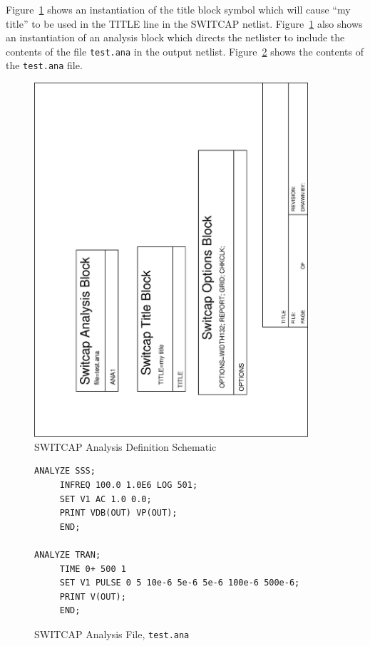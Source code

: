 \documentclass{article}
\begin{document}
Figure~\ref{fig:analysis} shows an instantiation of the title block
symbol which will cause ``my title'' to be used in the TITLE line in
the SWITCAP netlist. 
Figure~\ref{fig:analysis} also shows an instantiation of an analysis
block which directs the netlister to include the contents of the file
{\tt test.ana} in the output netlist.  Figure~\ref{fig:test.ana} shows
the contents of the {\tt test.ana} file.
\begin{figure}
\begin{center}
\includegraphics[angle=270,width=4in]{analysis.eps}
\end{center}
\caption{SWITCAP Analysis Definition Schematic}
\label{fig:analysis}
\end{figure}
\begin{figure}
\begin{center}
\begin{verbatim}
ANALYZE SSS;
     INFREQ 100.0 1.0E6 LOG 501;
     SET V1 AC 1.0 0.0;
     PRINT VDB(OUT) VP(OUT);
     END;

ANALYZE TRAN;
     TIME 0+ 500 1
     SET V1 PULSE 0 5 10e-6 5e-6 5e-6 100e-6 500e-6;
     PRINT V(OUT);
     END;
\end{verbatim}
\end{center}
\caption{SWITCAP Analysis File, {\tt test.ana}}
\label{fig:test.ana}
\end{figure}
\end{document}
